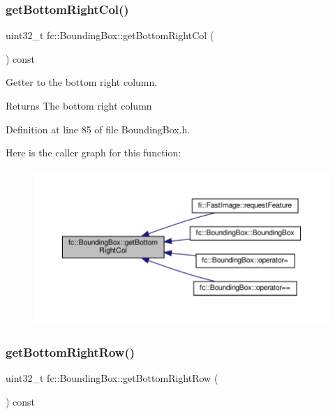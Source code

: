 \subsubsection{\texorpdfstring{get\+Bottom\+Right\+Col()}{getBottomRightCol()}}
{\footnotesize\ttfamily uint32\+\_\+t fc\+::\+Bounding\+Box\+::get\+Bottom\+Right\+Col (\begin{DoxyParamCaption}{ }\end{DoxyParamCaption}) const\hspace{0.3cm}{\ttfamily [inline]}}



Getter to the bottom right column. 

\begin{DoxyReturn}{Returns}
The bottom right column 
\end{DoxyReturn}


Definition at line 85 of file Bounding\+Box.\+h.

Here is the caller graph for this function\+:
\nopagebreak
\begin{figure}[H]
\begin{center}
\leavevmode
\includegraphics[width=350pt]{db/dc1/classfc_1_1BoundingBox_aedfb5b832d699a78a954c6778208414c_icgraph}
\end{center}
\end{figure}
\mbox{\label{classfc_1_1BoundingBox_a74411180845c0572329c693170621245}} 
\subsubsection{\texorpdfstring{get\+Bottom\+Right\+Row()}{getBottomRightRow()}}
{\footnotesize\ttfamily uint32\+\_\+t fc\+::\+Bounding\+Box\+::get\+Bottom\+Right\+Row (\begin{DoxyParamCaption}{ }\end{DoxyParamCaption}) const\hspace{0.3cm}{\ttfamily [inline]}}



